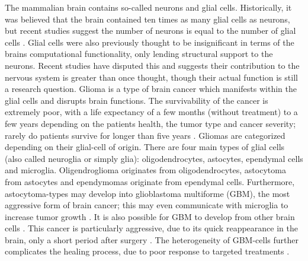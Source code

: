 The mammalian brain contains so-called neurons and glial cells. Historically, it was believed that the brain contained ten times as many glial cells as neurons, but recent studies suggest the number of neurons is equal to the number of glial cells \cite{von2016search}. Glial cells were also previously thought to be insignificant in terms of the brains computational functionality, only lending structural support to the neurons. Recent studies have disputed this and suggests their contribution to the nervous system is greater than once thought, though their actual function is still a research question. Glioma is a type of brain cancer which manifests within the glial cells and disrupts brain functions. The survivability of the cancer is extremely poor, with a life expectancy of a few months (without treatment) to a few years depending on the patients health, the tumor type and cancer severity; rarely do patients survive for longer than five years \cite{glialcells, gallego2015nonsurgical, bleeker2012recent}. Gliomas are categorized depending on their glial-cell of origin. There are four main types of glial cells (also called neuroglia or simply glia): oligodendrocytes, astocytes, ependymal cells and microglia. Oligendroglioma originates from oligodendrocytes, astocytoma from astocytes and ependymomas originate from ependymal cells. Furthermore, astocytoma-types may develop into glioblastoma multiforme (GBM), the most aggressive form of brain cancer; this may even communicate with  microglia to increase tumor growth \cite{maas2020glioblastoma}. It is also possible for GBM to develop from other brain cells \cite{glialcells}. This cancer is particularly aggressive, due to its quick reappearance in the brain, only a short period after surgery \cite{gallego2015nonsurgical}. The heterogeneity of GBM-cells further complicates the healing process, due to poor response to targeted treatments \cite{dirkse2019stem}.

